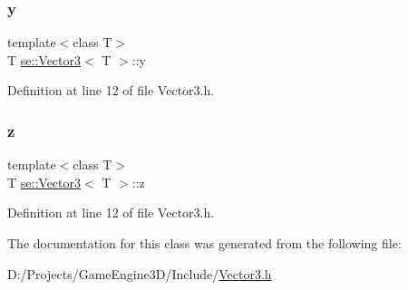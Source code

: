 \subsubsection{\texorpdfstring{y}{y}}
{\footnotesize\ttfamily template$<$class T$>$ \\
T \mbox{\hyperlink{classse_1_1_vector3}{se\+::\+Vector3}}$<$ T $>$\+::y}



Definition at line 12 of file Vector3.\+h.

\mbox{\label{classse_1_1_vector3_ac38fc2b30fc8426e66746a6220b21a03}} 
\subsubsection{\texorpdfstring{z}{z}}
{\footnotesize\ttfamily template$<$class T$>$ \\
T \mbox{\hyperlink{classse_1_1_vector3}{se\+::\+Vector3}}$<$ T $>$\+::z}



Definition at line 12 of file Vector3.\+h.



The documentation for this class was generated from the following file\+:\begin{DoxyCompactItemize}
\item 
D\+:/\+Projects/\+Game\+Engine3\+D/\+Include/\mbox{\hyperlink{_vector3_8h}{Vector3.\+h}}\end{DoxyCompactItemize}
